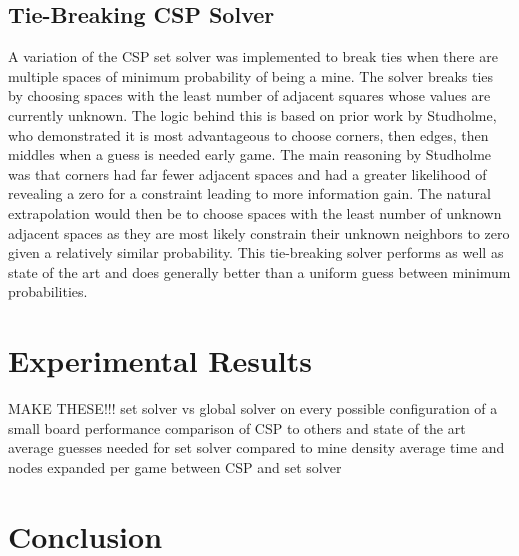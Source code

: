 \documentclass[letterpaper]{article}
\begin{document}
\subsection{Tie-Breaking CSP Solver}
A variation of the CSP set solver was implemented to break ties when there are multiple spaces of minimum probability of being a mine.  The solver breaks ties by choosing spaces with the least number of adjacent squares whose values are currently unknown.  The logic behind this is based on prior work by Studholme, who demonstrated it is most advantageous to choose corners, then edges, then middles when a guess is needed early game.  The main reasoning by Studholme was that corners had far fewer adjacent spaces and had a greater likelihood of revealing a zero for a constraint leading to more information gain.  The natural extrapolation would then be to choose spaces with the least number of unknown adjacent spaces as they are most likely constrain their unknown neighbors to zero given a relatively similar probability.  This tie-breaking solver performs as well as state of the art and does generally better than a uniform guess between minimum probabilities.

\section{Experimental Results}
MAKE THESE!!!
set solver vs global solver on every possible configuration of a small board
performance comparison of CSP to others and state of the art
average guesses needed for set solver compared to mine density
average time and nodes expanded per game between CSP and set solver

\section{Conclusion}
\end{document}
